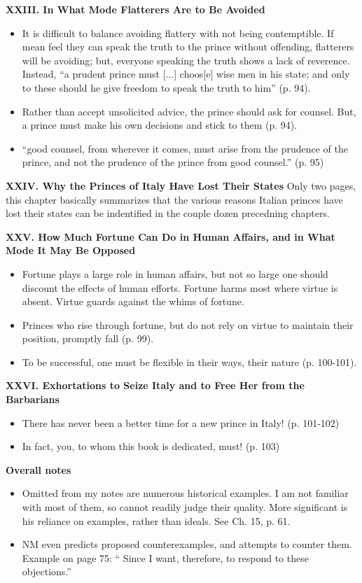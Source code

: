 \documentclass[10pt]{article}
\newcommand{\keyquote}[1]{{\color{BrickRed}#1}}
\begin{document}
\textbf{XXIII. In What Mode Flatterers Are to Be Avoided}
\begin{itemize}
\item
    It is difficult to balance avoiding flattery with not being
    contemptible. If mean feel they can speak the truth to the prince
    without offending, flatterers will be avoiding; but, everyone
    speaking the truth shows a lack of reverence. Instead, ``a 
    prudent prince must [...] choos[e] wise men in his state; and
    only to these should he give freedom to speak the truth to him''
    (p. 94). 
\item
    Rather than accept unsolicited advice, the prince should ask for 
    counsel. But, a prince must make his own decisions and stick
    to them (p. 94). 
\item
    \keyquote{
    ``good counsel, from wherever it comes, must arise from
    the prudence of the prince, and not the prudence of the
    prince from good counsel.''} (p. 95)
\end{itemize}

\textbf{XXIV. Why the Princes of Italy Have Lost Their States}
Only two pages, this chapter basically summarizes that the various
reasons Italian princes have lost their states can be indentified
in the couple dozen precedning chapters. 

\textbf{XXV. How Much Fortune Can Do in Human Affairs, and in What
Mode It May Be Opposed}
\begin{itemize}
\item
    Fortune plays a large role in human affairs, but not so large one
    should discount the effects of human efforts. Fortune harms
    most where virtue is absent. Virtue guards against the whims of
    fortune.
\item
    Princes who rise through fortune, but do not rely on virtue to
    maintain their position, promptly fall (p. 99).
\item
    To be successful, one must be flexible in their ways, 
    their nature (p. 100-101).
\end{itemize}

\textbf{XXVI. Exhortations to Seize Italy and to Free Her from the
Barbarians}
\begin{itemize}
\item
    There has never been a better time for a new prince in Italy!
    (p. 101-102)
\item 
    In fact, you, to whom this book is dedicated, must! (p. 103)
\end{itemize}

\textbf{Overall notes}
\begin{itemize}
\item
    Omitted from my notes are numerous historical examples. I am not 
    familiar with most of them, so cannot readily judge their quality.
    More significant is his reliance on examples, rather than 
    ideals. See Ch. 15, p. 61.
\item
    NM even predicts proposed counterexamples, and attempts to counter
    them. Example on page 75: `` Since I want, therefore, to respond to these
    objections.''
\end{itemize}
\end{document}
